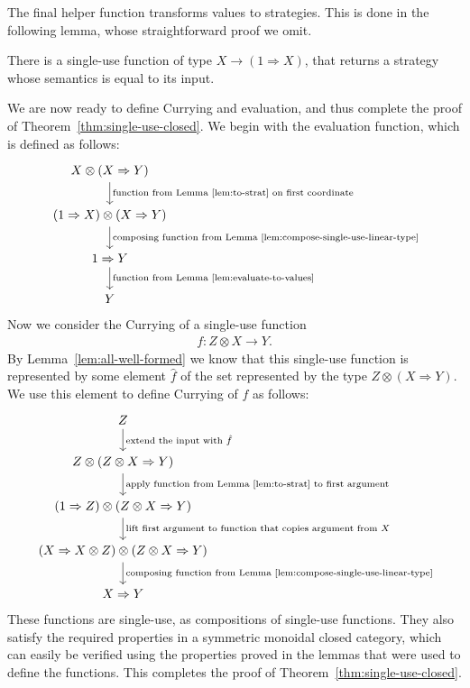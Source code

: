 The final helper function transforms values to strategies. This is done in the following lemma, whose straightforward proof we omit.
\begin{lemma}\label{lem:to-strat}
    There is a single-use function of type $X \to (1 \Rightarrow X)$, 
    that returns a strategy whose semantics is equal to its input.
 \end{lemma}


We are now ready to define Currying and evaluation, and thus  complete the proof of Theorem~\ref{thm:single-use-closed}.  We begin with the evaluation function, which is defined as follows: 
    \[
    \begin{tikzcd}
     X \otimes (X \Rightarrow Y) 
        \ar[d, "{\text{function from Lemma~\ref{lem:to-strat} on first coordinate}}"]
    \\
        (1 \Rightarrow X) \otimes (X \Rightarrow Y)
        \ar[d, "{\text{composing function from Lemma~\ref{lem:compose-single-use-linear-type}}}"]
        \\ 
        1 \Rightarrow Y   
        \ar[d, "{\text{function from Lemma~\ref{lem:evaluate-to-values}}}"]
        \\ 
        Y    
    \end{tikzcd}
    \]
    Now we consider the Currying of  a single-use function
\begin{align*}
f : Z \otimes X \to Y.
\end{align*}
By Lemma~\ref{lem:all-well-formed} we know that this single-use function is represented by some element $\hat f$ of the  set represented by the type $Z \otimes (X \Rightarrow Y)$. We use this element to define Currying of $f$ as follows:
\[
    \begin{tikzcd}
     Z  
        \ar[d, "{\text{extend the input with $\hat f$}}"]
    \\
    Z \otimes (Z \otimes X \Rightarrow Y)
        \ar[d, "{\text{apply function from Lemma~\ref{lem:to-strat} to first argument}}"]
        \\ 
        (1 \Rightarrow Z) \otimes (Z \otimes X \Rightarrow Y)   
        \ar[d, "{\text{lift first argument to function that copies argument from $X$}}"]
        \\ 
        (X \Rightarrow X \otimes Z)  \otimes (Z \otimes X \Rightarrow Y)
        \ar[d, "{\text{composing function from Lemma~\ref{lem:compose-single-use-linear-type}}}"]
        \\ 
        X \Rightarrow Y 
    \end{tikzcd}
    \]
These functions are single-use, as compositions of single-use functions. They also satisfy the required properties in a symmetric monoidal closed category, which can easily be verified using the properties proved in the lemmas that were used to define the functions. This completes the proof of  Theorem~\ref{thm:single-use-closed}.





